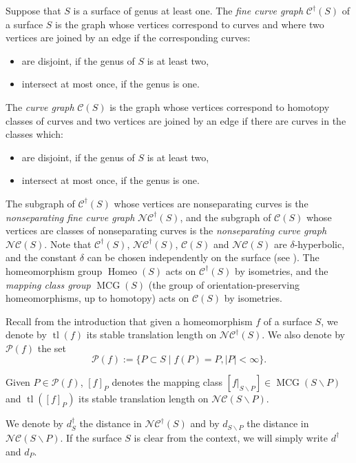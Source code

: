\documentclass{amsart}
\newcommand{\Pf}{\mathcal{P}}
\newcommand{\C}{\mathcal{C}}
\newcommand{\st}{\;|\;}
\newcommand{\Cdagger}{\C^\dagger}
\newcommand{\NC}{\mathcal{NC}}
\newcommand{\NCdagger}{\NC^\dagger}
\DeclareMathOperator{\Homeo}{Homeo}
\DeclareMathOperator{\mcg}{MCG}
\newcommand{\tl}[1]{\operatorname{tl}(#1)}
\newcommand{\ssm}{\smallsetminus}
\newcommand{\dist}{d}
\newcommand{\distdagger}{d^\dagger}
\theoremstyle{definition}
\begin{document}
Suppose that \(S\) is a surface of genus at least one. The \emph{fine curve graph} \(\Cdagger(S)\) of a surface \(S\) is the graph whose vertices correspond to curves and where two vertices are joined by an edge if the corresponding curves:
\begin{itemize}
\item are disjoint, if the genus of \(S\) is at least two,
\item intersect at most once, if the genus is one.
\end{itemize}
The \emph{curve graph} \(\C(S)\) is the graph whose vertices correspond to homotopy classes of curves and two vertices are joined by an edge if there are curves in the classes which:
\begin{itemize}
\item are disjoint, if the genus of \(S\) is at least two,
\item intersect at most once, if the genus is one.
\end{itemize}
The subgraph of \(\Cdagger(S)\) whose vertices are nonseparating curves is the \emph{nonseparating fine curve graph} \(\NCdagger(S)\), and the subgraph of \(\C(S)\) whose vertices are classes of nonseparating curves is the \emph{nonseparating curve graph} \(\NC(S)\). Note that \(\Cdagger(S)\), \(\NCdagger(S)\), \(\C(S)\) and \(\NC(S)\) are \(\delta\)-hyperbolic, and the constant \(\delta\) can be chosen independently on the surface (see \cite{bhw_quasi, mm_geometryI,aougab_uniform,bowditch_uniform,crs_uniform,hpw_unicorns}). 
The homeomorphism group \(\Homeo(S)\) acts on \(\Cdagger(S)\) by isometries, and the \emph{mapping class group} \(\mcg(S)\) (the group of orientation-preserving homeomorphisms, up to homotopy) acts on \(\C(S)\) by isometries.



Recall from the introduction that given a homeomorphism \(f\) of a surface \(S\), we denote by \(\tl{f}\) its stable translation length on \(\NCdagger(S)\). We also denote by \(\Pf(f)\) the set
\[\Pf(f):=\{P\subset S\st f(P)=P, |P|<\infty\}.\]

Given \(P\in\Pf(f)\), \([f]_P\) denotes the mapping class \([f|_{S\ssm P}]\in\mcg(S\ssm P)\) and \(\tl{[f]_{P}}\) its stable translation length on \(\NC(S\ssm P)\).

We denote by \(\distdagger_S\) the distance in \(\NCdagger(S)\) and by \(\dist_{S\ssm P}\) the distance in \(\NC(S\ssm P)\). If the surface \(S\) is clear from the context, we will simply write \(\distdagger\) and \(\dist_P\).
\end{document}
